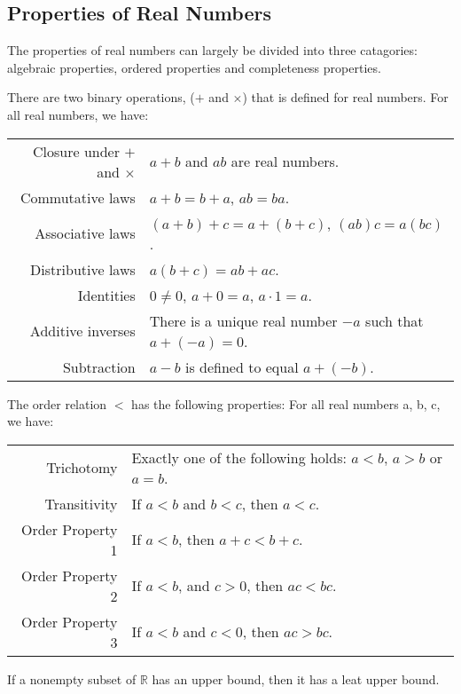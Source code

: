 \documentclass[a4paper]{article}
\begin{document}
\subsection{Properties of Real Numbers}
The properties of real numbers can largely be divided into three catagories: algebraic properties, ordered properties and completeness properties.
\begin{tcolorbox}[title= The algrebaic properties of real numbers]
	There are two binary operations, ($+$ and $\times$) that is defined for real numbers.
	For all real numbers, we have:

	\vspace{0.4cm}
	
	\begin{tabular}{rp{6cm}}
		
		Closure under  $+$ and  $\times$ &  $a + b$ and  $ab$ are real numbers. \\
		Commutative laws & $a + b = b + a$, $ab = ba$. \\
		Associative laws & $\left( a + b \right) + c = a + \left( b + c \right)$, 
		$\left( ab \right)c = a \left( bc \right)  $. \\
		Distributive laws & $a\left( b + c \right) = ab + ac $.\\
		Identities & $0 \not = 0$, $a + 0 = a$,  $a \cdot 1 = a$. \\
		Additive inverses & There is a unique real number $-a$ such that  
		$a + \left( -a \right) = 0 $. \\ 
		Subtraction & $a - b$ is defined to equal  $a + \left( -b \right).$ \\ 
	\end{tabular}
\end{tcolorbox}

\begin{tcolorbox}[title= The ordered property of real numbers]
	The order relation $ < $ has the following properties: For all real numbers a, b, c, we have:
	\vspace{0.4cm}
	
	\begin{tabular}{rp{6cm}}
		Trichotomy & Exactly one of the following holds: $a < b$,  $a > b$ or  $ a = b$. \\
		Transitivity & If $a < b$ and  $b < c$, then  $a < c$. \\
		Order Property 1 & If $a < b$, then  $a + c < b + c$. \\
		Order Property 2 & If $a < b$, and $c > 0$, then  $ac < bc$. \\
		Order Property 3 & If  $a < b$ and  $c < 0$, then $ac > bc$. \\		
	\end{tabular}
	
\end{tcolorbox}
\begin{tcolorbox}[title= The completeness property]
	If a nonempty subset of $\mathbb{R}$ has an upper bound, then it has a leat upper bound.
\end{tcolorbox}
\end{document}
